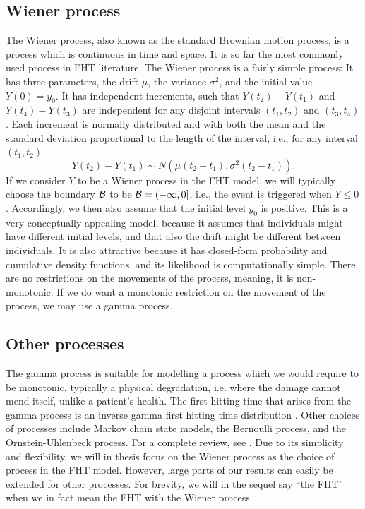 \subsection{Wiener process}\label{sec:wiener}
The Wiener process, also known as the standard Brownian motion process, is a process which is continuous in time and space. It is so far the most commonly used process in FHT literature. The Wiener process is a fairly simple process: It has three parameters, the drift $\mu$, the variance $\sigma^2$, and the initial value $Y(0)=y_0$. It has independent increments, such that $Y(t_2)-Y(t_1)$ and $Y(t_4)-Y(t_3)$ are independent for any disjoint intervals $(t_1,t_2)$ and $(t_3,t_4)$. Each increment is normally distributed and with both the mean and the standard deviation proportional to the length of the interval, i.e., for any interval $(t_1, t_2)$,
\begin{equation}
    Y(t_2)-Y(t_1)\sim N(\mu(t_2-t_1), \sigma^2(t_2-t_1)).
\end{equation}
If we consider $Y$ to be a Wiener process in the FHT model, we will typically choose the boundary $\mathcal{B}$ to be $\mathcal{B}=(-\infty,0]$, i.e., the event is triggered when $Y\leq0$. Accordingly, we then also assume that the initial level $y_0$ is positive. This is a very conceptually appealing model, because it assumes that individuals might have different initial levels, and that also the drift might be different between individuals. It is also attractive because it has closed-form probability and cumulative density functions, and its likelihood is computationally simple. There are no restrictions on the movements of the process, meaning, it is non-monotonic. If we do want a monotonic restriction on the movement of the process, we may use a gamma process.

\subsection{Other processes}
The gamma process is suitable for modelling a process which we would require to be monotonic, typically a physical degradation, i.e. where the damage cannot mend itself, unlike a patient's health. The first hitting time that arises from the gamma process is an inverse gamma first hitting time distribution \citep{leewhitmore2006}. Other choices of processes include Markov chain state models, the Bernoulli process, and the Ornstein-Uhlenbeck process. For a complete review, see \citet{leewhitmore2006}. Due to its simplicity and flexibility, we will in thesis focus on the Wiener process as the choice of process in the FHT model. However, large parts of our results can easily be extended for other processes. For brevity, we will in the sequel say ``the FHT'' when we in fact mean the FHT with the Wiener process.

